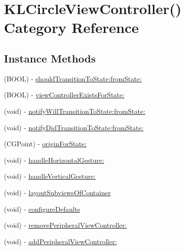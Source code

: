\hypertarget{category_k_l_circle_view_controller_07_08}{\section{K\-L\-Circle\-View\-Controller() Category Reference}
\label{category_k_l_circle_view_controller_07_08}
}
\subsection*{Instance Methods}
\begin{DoxyCompactItemize}
\item 
(B\-O\-O\-L) -\/ \hyperlink{category_k_l_circle_view_controller_07_08_ac57d027b24658d9eadab3a9b15ed7463}{should\-Transition\-To\-State\-:from\-State\-:}
\item 
(B\-O\-O\-L) -\/ \hyperlink{category_k_l_circle_view_controller_07_08_adfb6c557b1d272f23e0140ba2922619b}{view\-Controller\-Exists\-For\-State\-:}
\item 
(void) -\/ \hyperlink{category_k_l_circle_view_controller_07_08_addd2660e59f92bb1373726462682004b}{notify\-Will\-Transition\-To\-State\-:from\-State\-:}
\item 
(void) -\/ \hyperlink{category_k_l_circle_view_controller_07_08_aeeb30d6ec6f4c0cb60c33a28ac08cfb5}{notify\-Did\-Transition\-To\-State\-:from\-State\-:}
\item 
(C\-G\-Point) -\/ \hyperlink{category_k_l_circle_view_controller_07_08_afc45739dcdb02215de9adfce70172e3a}{origin\-For\-State\-:}
\item 
(void) -\/ \hyperlink{category_k_l_circle_view_controller_07_08_add97e1ac579105f0d7d898d5d7e74e30}{handle\-Horizontal\-Gesture\-:}
\item 
(void) -\/ \hyperlink{category_k_l_circle_view_controller_07_08_a164a25b39510052399ed1e54b4514aed}{handle\-Vertical\-Gesture\-:}
\item 
(void) -\/ \hyperlink{category_k_l_circle_view_controller_07_08_a9779e848df6602f20c7d5e2be984d0d1}{layout\-Subviews\-Of\-Container}
\item 
(void) -\/ \hyperlink{category_k_l_circle_view_controller_07_08_a1d5c6419538b453d2312fa2f947d473a}{configure\-Defaults}
\item 
(void) -\/ \hyperlink{category_k_l_circle_view_controller_07_08_aeef3e4d666350c0c0f00acecbe2a2268}{remove\-Peripheral\-View\-Controller\-:}
\item 
(void) -\/ \hyperlink{category_k_l_circle_view_controller_07_08_ae612f5656c406067dab3b45256cf27c7}{add\-Peripheral\-View\-Controller\-:}
\end{DoxyCompactItemize}
